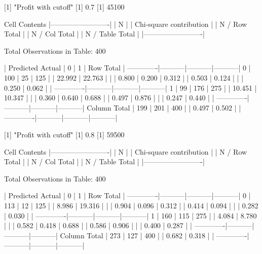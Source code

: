 \documentclass{article}
\begin{document}
\begin{Schunk}
\begin{Soutput}
 
[1] "Profit with cutoff"
[1] 0.7
[1] 45100

 
   Cell Contents
|-------------------------|
|                       N |
| Chi-square contribution |
|           N / Row Total |
|           N / Col Total |
|         N / Table Total |
|-------------------------|

 
Total Observations in Table:  400 

 
             | Predicted 
      Actual |         0 |         1 | Row Total | 
-------------|-----------|-----------|-----------|
           0 |       100 |        25 |       125 | 
             |    22.992 |    22.763 |           | 
             |     0.800 |     0.200 |     0.312 | 
             |     0.503 |     0.124 |           | 
             |     0.250 |     0.062 |           | 
-------------|-----------|-----------|-----------|
           1 |        99 |       176 |       275 | 
             |    10.451 |    10.347 |           | 
             |     0.360 |     0.640 |     0.688 | 
             |     0.497 |     0.876 |           | 
             |     0.247 |     0.440 |           | 
-------------|-----------|-----------|-----------|
Column Total |       199 |       201 |       400 | 
             |     0.497 |     0.502 |           | 
-------------|-----------|-----------|-----------|

 
[1] "Profit with cutoff"
[1] 0.8
[1] 59500

 
   Cell Contents
|-------------------------|
|                       N |
| Chi-square contribution |
|           N / Row Total |
|           N / Col Total |
|         N / Table Total |
|-------------------------|

 
Total Observations in Table:  400 

 
             | Predicted 
      Actual |         0 |         1 | Row Total | 
-------------|-----------|-----------|-----------|
           0 |       113 |        12 |       125 | 
             |     8.986 |    19.316 |           | 
             |     0.904 |     0.096 |     0.312 | 
             |     0.414 |     0.094 |           | 
             |     0.282 |     0.030 |           | 
-------------|-----------|-----------|-----------|
           1 |       160 |       115 |       275 | 
             |     4.084 |     8.780 |           | 
             |     0.582 |     0.418 |     0.688 | 
             |     0.586 |     0.906 |           | 
             |     0.400 |     0.287 |           | 
-------------|-----------|-----------|-----------|
Column Total |       273 |       127 |       400 | 
             |     0.682 |     0.318 |           | 
-------------|-----------|-----------|-----------|


\end{Soutput}
\end{Schunk}
\end{document}

